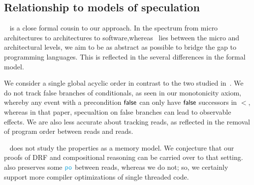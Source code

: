 \subsection{Relationship to models of speculation}
 ~\citet{2019-sp} is a close formal cousin to our approach.   In the spectrum from micro architectures to architectures to software,whereas~\citet{2019-sp} lies between the micro and architectural levels, we aim to be as abstract as possible to bridge the gap to programming languages.  This is reflected in the several differences in the formal model.  

We consider a single global acyclic order in contrast to the two studied in~\citet{2019-sp}.  We do not track false branches of conditionals, as seen in our monotonicity axiom, whereby any event with a precondition $\mathsf{false}$ can only have $\mathsf{false}$ successors in $\lt$, whereas in that paper, specualtion on false branches can lead to observable effects.   We are also less accurate  about tracking reads, as reflected in the removal of program order between reads and reads.   

~\citet{2019-sp} does not study the properties as a memory model.  We conjecture that our proofs of DRF and compositional reasoning can be carried over to that setting.~\citet{2019-sp} also preserves some $\rpox$ between reads, whereas we do not; so, we certainly support more compiler optimizations of single threaded code. 



